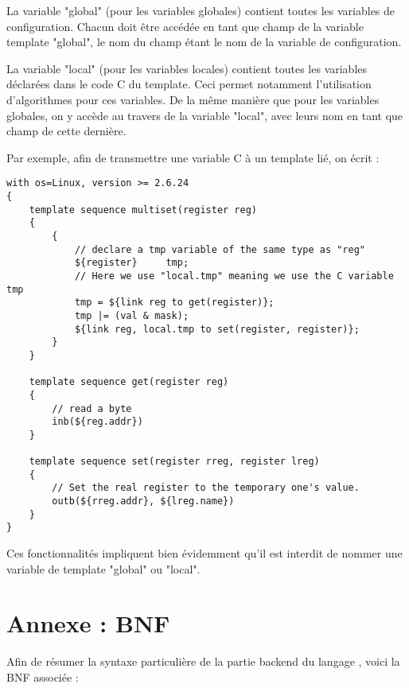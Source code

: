 \documentclass[french]{rtxreport}
\begin{document}
La variable "global" (pour les variables globales) contient toutes les variables
de configuration. Chacun doit être accédée en tant que champ de la variable 
template "global", le nom du champ étant le nom de la variable de configuration.

La variable "local" (pour les variables locales) contient toutes les variables
déclarées dans le code C du template. Ceci permet notamment l'utilisation
d'algorithmes \rtx pour ces variables. De la même manière que pour les
variables globales, on y accède au travers de la variable "local", avec leurs
nom en tant que champ de cette dernière.

Par exemple, afin de transmettre une variable C à un template lié, on écrit :
\begin{lstlisting}
with os=Linux, version >= 2.6.24
{
    template sequence multiset(register reg)
    {
        {
            // declare a tmp variable of the same type as "reg"
            ${register}     tmp;
            // Here we use "local.tmp" meaning we use the C variable tmp
            tmp = ${link reg to get(register)};
            tmp |= (val & mask);
            ${link reg, local.tmp to set(register, register)};
        }
    }

    template sequence get(register reg)
    {
        // read a byte
        inb(${reg.addr})
    }

    template sequence set(register rreg, register lreg)
    {
        // Set the real register to the temporary one's value.
        outb(${rreg.addr}, ${lreg.name})
    }
}
\end{lstlisting}

Ces fonctionnalités impliquent bien évidemment qu'il est interdit de nommer une
variable de template "global" ou "local".


\chapter{Annexe : BNF}

Afin de résumer la syntaxe particulière de la partie backend du langage \rtx,
voici la BNF associée :
\end{document}
